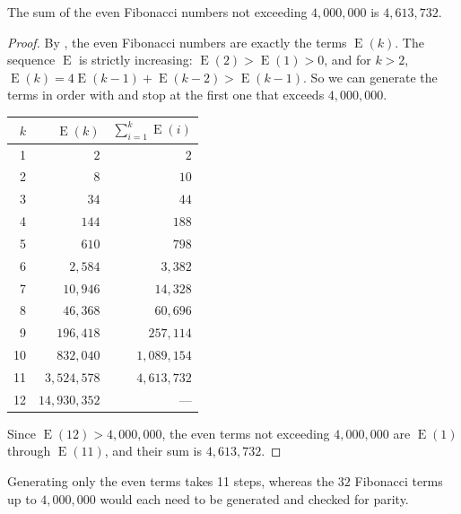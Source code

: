\documentclass{article}
\begin{document}
\begin{theorem}\label{thm:answer}
  The sum of the even Fibonacci numbers not exceeding $4{,}000{,}000$ is $4{,}613{,}732$.
\end{theorem}
\begin{proof}
  By , the even Fibonacci numbers are exactly the terms $\operatorname{E}(k)$. The sequence
  $\operatorname{E}$ is strictly increasing: $\operatorname{E}(2) > \operatorname{E}(1) > 0$, and for $k > 2$,
  $\operatorname{E}(k) = 4\operatorname{E}(k-1) + \operatorname{E}(k-2) > \operatorname{E}(k-1)$. So we can generate the
  terms in order with  and stop at the first one that exceeds $4{,}000{,}000$.

  \begin{center}
    \begin{tabular}{rrr}
      $k$ & $\operatorname{E}(k)$ & $\sum_{i=1}^{k} \operatorname{E}(i)$ \\
      \hline
      1  & $2$            & $2$           \\
      2  & $8$            & $10$          \\
      3  & $34$           & $44$          \\
      4  & $144$          & $188$         \\
      5  & $610$          & $798$         \\
      6  & $2{,}584$      & $3{,}382$     \\
      7  & $10{,}946$     & $14{,}328$    \\
      8  & $46{,}368$     & $60{,}696$    \\
      9  & $196{,}418$    & $257{,}114$   \\
      10 & $832{,}040$    & $1{,}089{,}154$ \\
      11 & $3{,}524{,}578$ & $4{,}613{,}732$ \\
      \hline
      12 & $14{,}930{,}352$ & ---         \\
    \end{tabular}
  \end{center}

  Since $\operatorname{E}(12) > 4{,}000{,}000$, the even terms not exceeding $4{,}000{,}000$ are
  $\operatorname{E}(1)$ through $\operatorname{E}(11)$, and their sum is $4{,}613{,}732$.
\end{proof}

Generating only the even terms takes 11 steps, whereas the $32$ Fibonacci terms up to $4{,}000{,}000$ would each need to
be generated and checked for parity.
\end{document}
